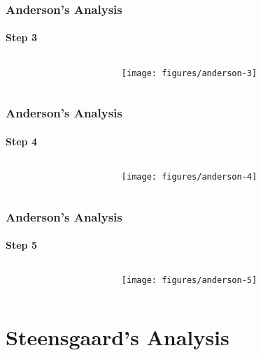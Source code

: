 \documentclass[]{beamer}
\begin{document}
\begin{frame}
  \frametitle{Anderson's Analysis}
  \framesubtitle{Step 3}
  \begin{columns}
    \begin{column}{.4\textwidth}
      
      
    \end{column}
    \begin{column}{.6\textwidth}
      \texttt{[image: figures/anderson-3]}
    \end{column}
  \end{columns}
\end{frame}

\begin{frame}
  \frametitle{Anderson's Analysis}
  \framesubtitle{Step 4}
  \begin{columns}
    \begin{column}{.4\textwidth}
      
      
    \end{column}
    \begin{column}{.6\textwidth}
      \texttt{[image: figures/anderson-4]}
    \end{column}
  \end{columns}
\end{frame}

\begin{frame}
  \frametitle{Anderson's Analysis}
  \framesubtitle{Step 5}
  \begin{columns}
    \begin{column}{.4\textwidth}
      
      
    \end{column}
    \begin{column}{.6\textwidth}
      \texttt{[image: figures/anderson-5]}
    \end{column}
  \end{columns}
\end{frame}

\section{Steensgaard's Analysis}
\frame{\tableofcontents[currentsection]}
\end{document}
